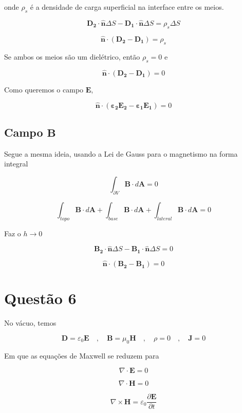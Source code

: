 \noindent onde $\rho_s$ é a densidade de carga superficial na interface entre os meios.

\[ \mathbf{D_2} \cdot \mathbf{\hat{n}} \Delta S - \mathbf{D_1} \cdot \mathbf{\hat{n}} \Delta S = \rho_s \Delta S \]

\[ \mathbf{\hat{n}} \cdot \left( \mathbf{D_2} - \mathbf{D_1} \right) = \rho_s \]

Se ambos os meios são um dielétrico, então $\rho_s = 0$ e 

\[ \mathbf{\hat{n}} \cdot \left( \mathbf{D_2} - \mathbf{D_1} \right) = 0 \]

Como queremos o campo $\mathbf{E}$, 

\[ \mathbf{\hat{n}} \cdot \left( \mathbf{\varepsilon_2 \mathbf{E_2}} - \mathbf{\varepsilon_1 \mathbf{E_1}} \right) = 0 \]

\section{Campo $\mathbf{B}$ }

Segue a mesma ideia, usando a Lei de Gauss para o magnetismo na forma integral

\[ \int_{\partial V} \mathbf{B} \cdot d\mathbf{A}
= 0 \]

\[ \int_{topo} \mathbf{B} \cdot d\mathbf{A} + \int_{base} \mathbf{B} \cdot d\mathbf{A} + \int_{lateral} \mathbf{B} \cdot d\mathbf{A}
= 0 \]

Faz o $h \to 0$

\[\mathbf{B_2} \cdot \mathbf{\hat{n}} \Delta S - \mathbf{B_1} \cdot \mathbf{\hat{n}} \Delta S = 0\]

\[ \mathbf{\hat{n}} \cdot \left( \mathbf{B_2} - \mathbf{B_1} \right) = 0 \]

\chapter{Questão 6}\label{cap:q6}

No vácuo, temos 

\[  \mathbf{D} = \varepsilon_0 \mathbf{E} \quad , \quad \mathbf{B} = \mu_0 \mathbf{H} 
\quad , \quad \rho = 0 \quad , \quad \mathbf{J} = 0 \]

Em que as equações de Maxwell se reduzem para 

\[ \nabla \cdot \mathbf{E} = 0  \]

\[ \nabla \cdot \mathbf{H} = 0 \]

\[ \nabla \times \mathbf{H} = \varepsilon_0 \frac{\partial \mathbf{E}}{\partial t} \]


